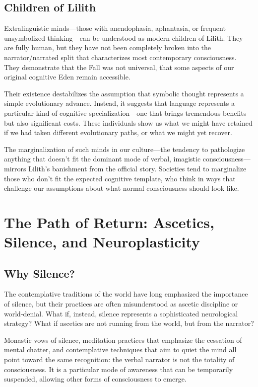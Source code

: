 \subsection{Children of Lilith}

Extralinguistic minds—those with anendophasia, aphantasia, or frequent unsymbolized thinking—can be understood as modern children of Lilith. They are fully human, but they have not been completely broken into the narrator/narrated split that characterizes most contemporary consciousness. They demonstrate that the Fall was not universal, that some aspects of our original cognitive Eden remain accessible.

Their existence destabilizes the assumption that symbolic thought represents a simple evolutionary advance. Instead, it suggests that language represents a particular kind of cognitive specialization—one that brings tremendous benefits but also significant costs. These individuals show us what we might have retained if we had taken different evolutionary paths, or what we might yet recover.

The marginalization of such minds in our culture—the tendency to pathologize anything that doesn't fit the dominant mode of verbal, imagistic consciousness—mirrors Lilith's banishment from the official story. Societies tend to marginalize those who don't fit the expected cognitive template, who think in ways that challenge our assumptions about what normal consciousness should look like.

\section{The Path of Return: Ascetics, Silence, and Neuroplasticity}

\subsection{Why Silence?}

The contemplative traditions of the world have long emphasized the importance of silence, but their practices are often misunderstood as ascetic discipline or world-denial. What if, instead, silence represents a sophisticated neurological strategy? What if ascetics are not running from the world, but from the narrator?

Monastic vows of silence, meditation practices that emphasize the cessation of mental chatter, and contemplative techniques that aim to quiet the mind all point toward the same recognition: the verbal narrator is not the totality of consciousness. It is a particular mode of awareness that can be temporarily suspended, allowing other forms of consciousness to emerge.

